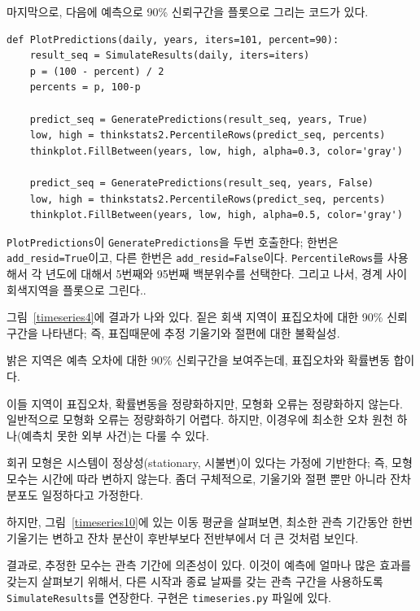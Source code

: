 마지막으로, 다음에 예측으로 90\% 신뢰구간을 플롯으로 그리는 코드가 있다.

\begin{verbatim}
def PlotPredictions(daily, years, iters=101, percent=90):
    result_seq = SimulateResults(daily, iters=iters)
    p = (100 - percent) / 2
    percents = p, 100-p

    predict_seq = GeneratePredictions(result_seq, years, True)
    low, high = thinkstats2.PercentileRows(predict_seq, percents)
    thinkplot.FillBetween(years, low, high, alpha=0.3, color='gray')

    predict_seq = GeneratePredictions(result_seq, years, False)
    low, high = thinkstats2.PercentileRows(predict_seq, percents)
    thinkplot.FillBetween(years, low, high, alpha=0.5, color='gray')
\end{verbatim}

{\tt PlotPredictions}이 {\tt GeneratePredictions}을 두번 호출한다; 한번은 \verb"add_resid=True"이고, 다른 한번은 \verb"add_resid=False"이다.
{\tt PercentileRows}를 사용해서 각 년도에 대해서 5번째와 95번째 백분위수를 선택한다. 그리고 나서, 경계 사이 회색지역을 플롯으로 그린다..

그림~\ref{timeseries4}에 결과가 나와 있다.
짙은 회색 지역이 표집오차에 대한 90\% 신뢰구간을 나타낸다; 즉,
표집때문에 추정 기울기와 절편에 대한 불확실성.

밝은 지역은 예측 오차에 대한 90\% 신뢰구간을 보여주는데,
표집오차와 확률변동 합이다.

이들 지역이 표집오차, 확률변동을 정량화하지만, 모형화 오류는 정량화하지 않는다. 일반적으로 모형화 오류는 정량화하기 어렵다. 하지만, 이경우에 최소한 오차 원천 하나(예측치 못한 외부 사건)는 다룰 수 있다.

회귀 모형은 시스템이 정상성(stationary, 시불변)이 있다는 가정에 기반한다; 즉, 모형 모수는 시간에 따라 변하지 않는다.
좀더 구체적으로, 기울기와 절편 뿐만 아니라 잔차 분포도 일정하다고 가정한다.

하지만, 그림~\ref{timeseries10}에 있는 이동 평균을 살펴보면, 최소한 관측 기간동안 한번 기울기는 변하고 잔차 분산이 후반부보다 전반부에서 더 큰 것처럼 보인다.

결과로, 추정한 모수는 관측 기간에 의존성이 있다.
이것이 예측에 얼마나 많은 효과를 갖는지 살펴보기 위해서,
다른 시작과 종료 날짜를 갖는 관측 구간을 사용하도록 {\tt SimulateResults}를 연장한다.
구현은 {\tt timeseries.py} 파일에 있다.

